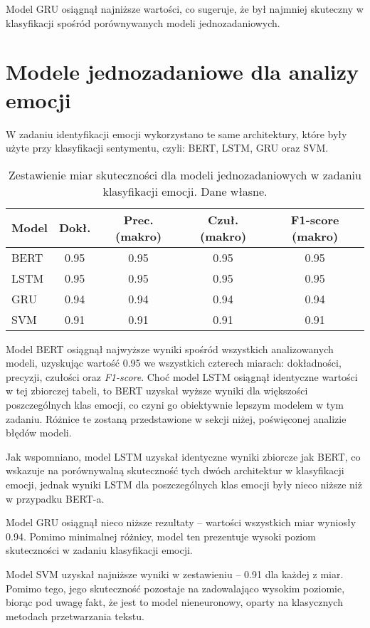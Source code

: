 Model GRU osiągnął najniższe wartości, co sugeruje, że był najmniej skuteczny w klasyfikacji spośród porównywanych modeli jednozadaniowych.

\newpage
\section{Modele jednozadaniowe dla analizy emocji}

W zadaniu identyfikacji emocji wykorzystano te same architektury, które były użyte przy klasyfikacji sentymentu, czyli: BERT, LSTM, GRU oraz SVM.

\begin{table}[H]
\centering
\label{tab:emotion_models}
\begin{tabular}{|l|c|c|c|c|}
\hline
\textbf{Model} & \textbf{Dokł.} & \textbf{Prec. (makro)} & \textbf{Czuł. (makro)} & \textbf{F1-score (makro)} \\
\hline
BERT & 0.95 & 0.95 & 0.95 & 0.95 \\
LSTM & 0.95 & 0.95 & 0.95 & 0.95 \\
GRU  & 0.94 & 0.94 & 0.94 & 0.94 \\
SVM  & 0.91 & 0.91 & 0.91 & 0.91 \\
\hline
\end{tabular}
\caption{Zestawienie miar skuteczności dla modeli jednozadaniowych w zadaniu klasyfikacji emocji. Dane własne.}
\end{table}

Model BERT osiągnął najwyższe wyniki spośród wszystkich analizowanych modeli, uzyskując wartość 0.95 we wszystkich czterech miarach: dokładności, precyzji, czułości oraz \textit{F1-score}. Choć model LSTM osiągnął identyczne wartości w tej zbiorczej tabeli, to BERT uzyskał wyższe wyniki dla większości poszczególnych klas emocji, co czyni go obiektywnie lepszym modelem w tym zadaniu. Różnice te zostaną przedstawione w sekcji niżej, poświęconej analizie błędów modeli.

Jak wspomniano, model LSTM uzyskał identyczne wyniki zbiorcze jak BERT, co wskazuje na porównywalną skuteczność tych dwóch architektur w klasyfikacji emocji, jednak wyniki LSTM dla poszczególnych klas emocji były nieco niższe niż w przypadku BERT-a.

Model GRU osiągnął nieco niższe rezultaty -- wartości wszystkich miar wyniosły 0.94. Pomimo minimalnej różnicy, model ten prezentuje wysoki poziom skuteczności w zadaniu klasyfikacji emocji.

Model SVM uzyskał najniższe wyniki w zestawieniu -- 0.91 dla każdej z miar. Pomimo tego, jego skuteczność pozostaje na zadowalająco wysokim poziomie, biorąc pod uwagę fakt, że jest to model nieneuronowy, oparty na klasycznych metodach przetwarzania tekstu.

